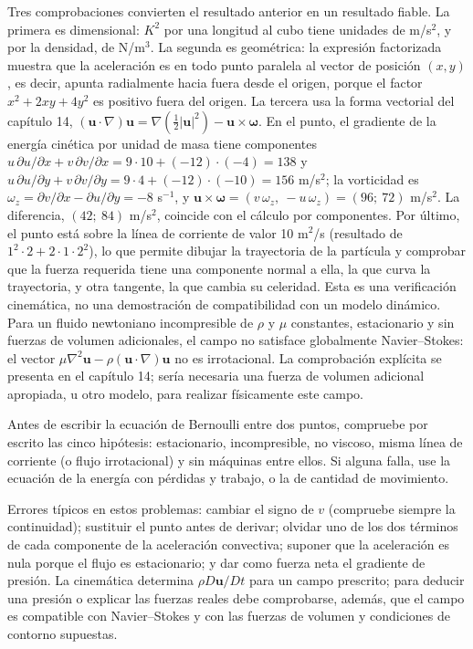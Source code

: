 \documentclass[10pt,openany]{book}
\begin{document}
Tres comprobaciones convierten el resultado anterior en un resultado fiable. La primera es dimensional: \(K^{2}\) por una longitud al cubo tiene unidades de m/s\(^2\), y por la densidad, de N/m\(^3\). La segunda es geométrica: la expresión factorizada muestra que la aceleración es en todo punto paralela al vector de posición \((x, y)\), es decir, apunta radialmente hacia fuera desde el origen, porque el factor \(x^{2} + 2xy + 4y^{2}\) es positivo fuera del origen. La tercera usa la forma vectorial del capítulo 14, \((\mathbf{u}\cdot\nabla)\mathbf{u} = \nabla\!\left(\tfrac12|\mathbf{u}|^{2}\right) - \mathbf{u}\times\boldsymbol{\omega}\). En el punto, el gradiente de la energía cinética por unidad de masa tiene componentes \(u\,\partial u/\partial x + v\,\partial v/\partial x = 9\cdot 10 + (-12)\cdot(-4) = 138\) y \(u\,\partial u/\partial y + v\,\partial v/\partial y = 9\cdot 4 + (-12)\cdot(-10) = 156\) m/s\(^2\); la vorticidad es \(\omega_z = \partial v/\partial x - \partial u/\partial y = -8\) s\(^{-1}\), y \(\mathbf{u}\times\boldsymbol{\omega} = (v\,\omega_z,\ -u\,\omega_z) = (96;\ 72)\) m/s\(^2\). La diferencia, \((42;\ 84)\) m/s\(^2\), coincide con el cálculo por componentes. Por último, el punto está sobre la línea de corriente de valor 10 m\(^2\)/s (resultado de \(1^2\cdot 2 + 2\cdot 1\cdot 2^2\)), lo que permite dibujar la trayectoria de la partícula y comprobar que la fuerza requerida tiene una componente normal a ella, la que curva la trayectoria, y otra tangente, la que cambia su celeridad. Esta es una verificación cinemática, no una demostración de compatibilidad con un modelo dinámico. Para un fluido newtoniano incompresible de \(\rho\) y \(\mu\) constantes, estacionario y sin fuerzas de volumen adicionales, el campo no satisface globalmente Navier--Stokes: el vector \(\mu\nabla^{2}\mathbf{u}-\rho(\mathbf{u}\cdot\nabla)\mathbf{u}\) no es irrotacional. La comprobación explícita se presenta en el capítulo 14; sería necesaria una fuerza de volumen adicional apropiada, u otro modelo, para realizar físicamente este campo.

\begin{tcolorbox}[title={Consejo}, studiumtip, breakable]

Antes de escribir la ecuación de Bernoulli entre dos puntos, compruebe por escrito las cinco hipótesis: estacionario, incompresible, no viscoso, misma línea de corriente (o flujo irrotacional) y sin máquinas entre ellos. Si alguna falla, use la ecuación de la energía con pérdidas y trabajo, o la de cantidad de movimiento.

Errores típicos en estos problemas: cambiar el signo de \(v\) (compruebe siempre la continuidad); sustituir el punto antes de derivar; olvidar uno de los dos términos de cada componente de la aceleración convectiva; suponer que la aceleración es nula porque el flujo es estacionario; y dar como fuerza neta el gradiente de presión. La cinemática determina \(\rho D\mathbf{u}/Dt\) para un campo prescrito; para deducir una presión o explicar las fuerzas reales debe comprobarse, además, que el campo es compatible con Navier--Stokes y con las fuerzas de volumen y condiciones de contorno supuestas.
\end{tcolorbox}
\end{document}
